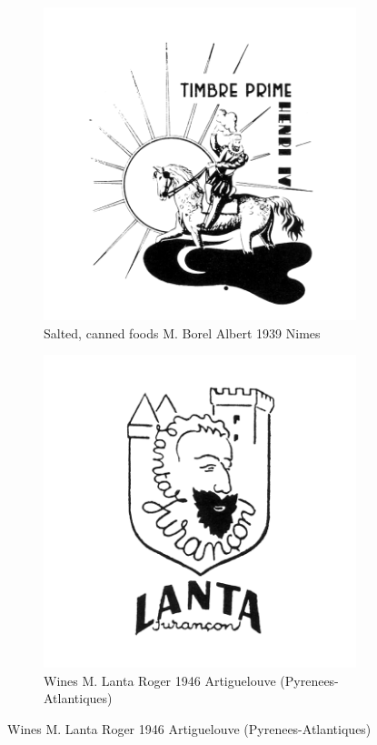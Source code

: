 \begin{figure}[h]
  \begin{subfigure}{.45\textwidth}
    \centering
    \includegraphics[width=.5\linewidth]{images/supplement/trademarks/french/6_8}
    \caption{Salted, canned foods M. Borel Albert 1939 Nimes}
    \label{fig:trademarks:french:6.8}
  \end{subfigure}\hfill
  \begin{subfigure}{.45\textwidth}
    \centering
    \includegraphics[width=.5\linewidth]{images/supplement/trademarks/french/6_9}
    \caption{Wines M. Lanta Roger 1946 Artiguelouve (Pyrenees-Atlantiques)}
    \label{fig:trademarks:french:6.9}
  \end{subfigure}


\end{figure}
